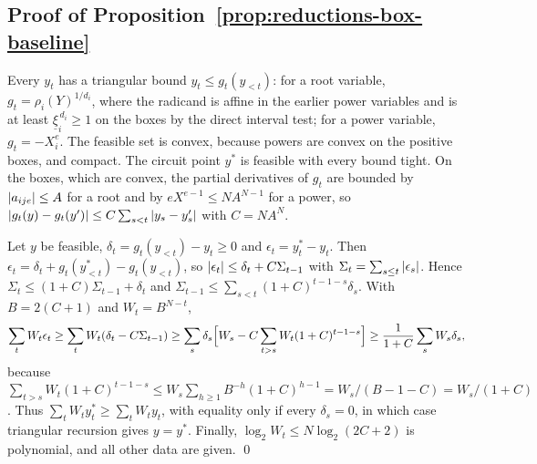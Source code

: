 \subsection{Proof of Proposition~\ref{prop:reductions-box-baseline}}
\label{app:reductions-comparisons}

Every $y_t$ has a triangular bound $y_t\le g_t(y_{<t})$: for a root variable,
$g_t=\rho_i(Y)^{1/d_i}$, where the radicand is affine in the earlier power
variables and is at least $\underline\xi_i^{\,d_i}\ge1$ on the boxes by the direct
interval test; for a power variable, $g_t=-X_i^e$. The feasible set is convex,
because powers are convex on the positive boxes, and compact. The circuit point
$y^*$ is feasible with every bound tight. On the boxes, which are convex, the
partial derivatives of $g_t$ are bounded by $\left\lvert a_{ije}\right\rvert\le A$ for a root and by
$eX^{e-1}\le NA^{N-1}$ for a power, so
$\left\lvert g_t(y)-g_t(y')\right\rvert\le C\sum_{s<t}\left\lvert y_s-y'_s\right\rvert$ with $C=NA^N$.

Let $y$ be feasible, $\delta_t=g_t(y_{<t})-y_t\ge0$ and $\epsilon_t=y^*_t-y_t$. Then
$\epsilon_t=\delta_t+g_t(y^*_{<t})-g_t(y_{<t})$, so
$\left\lvert\epsilon_t\right\rvert\le\delta_t+C\Sigma_{t-1}$ with $\Sigma_t=\sum_{s\le t}\left\lvert\epsilon_s\right\rvert$.
Hence $\Sigma_t\le(1+C)\Sigma_{t-1}+\delta_t$ and
$\Sigma_{t-1}\le\sum_{s<t}(1+C)^{t-1-s}\delta_s$. With $B=2(C+1)$ and $W_t=B^{N-t}$,
\[
 \sum_tW_t\epsilon_t\ge\sum_tW_t(\delta_t-C\Sigma_{t-1})
 \ge\sum_s\delta_s\Bigl[W_s-C\sum_{t>s}W_t(1+C)^{t-1-s}\Bigr]
 \ge\frac1{1+C}\sum_sW_s\delta_s,
\]
because $\sum_{t>s}W_t(1+C)^{t-1-s}\le W_s\sum_{h\ge1}B^{-h}(1+C)^{h-1}
=W_s/(B-1-C)=W_s/(1+C)$. Thus $\sum_tW_ty^*_t\ge\sum_tW_ty_t$, with equality only
if every $\delta_s=0$, in which case triangular recursion gives $y=y^*$. Finally,
$\log_2W_t\le N\log_2(2C+2)$ is polynomial, and all other data are given. \qed
